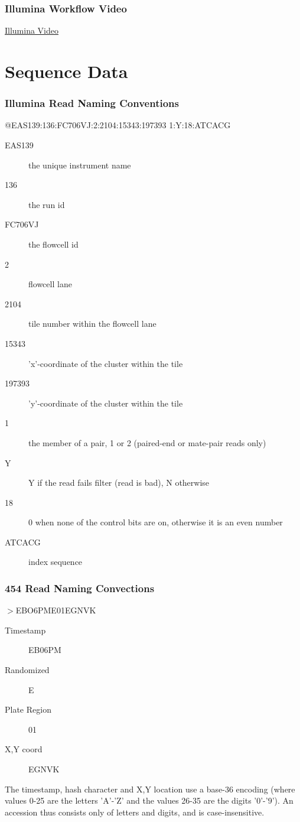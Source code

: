 \documentclass[pdf]{beamer}
\begin{document}
\begin{frame}
  \frametitle{Illumina Workflow Video}
  \begin{center}
  \href{http://www.youtube.com/watch?NR=1&feature=endscreen&v=l99aKKHcxC4}{Illumina Video}
  \end{center}
\end{frame} 

\section{Sequence Data}

\begin{frame}
  \frametitle{Illumina Read Naming Conventions}
  \begin{small}
  @EAS139:136:FC706VJ:2:2104:15343:197393 1:Y:18:ATCACG\\
  \end{small}  
  \begin{description}
  \item[EAS139]	the unique instrument name
  \item[136]	the run id
  \item[FC706VJ]	the flowcell id
  \item[2]	flowcell lane
  \item[2104]	tile number within the flowcell lane
  \item[15343]	'x'-coordinate of the cluster within the tile
  \item[197393]	'y'-coordinate of the cluster within the tile
  \item[1]	the member of a pair, 1 or 2 (paired-end or mate-pair reads only)
  \item[Y]	Y if the read fails filter (read is bad), N otherwise
  \item[18]	0 when none of the control bits are on, otherwise it is an even     number
  \item[ATCACG]	index sequence
  \end{description}
\end{frame}

\begin{frame}
  \frametitle{454 Read Naming Convections}
  $>$EBO6PME01EGNVK
  \begin{description}
  \item[Timestamp] EB06PM
  \item[Randomized ] E
  \item[Plate Region] 01
  \item[X,Y coord] EGNVK
  \end{description}
  The timestamp, hash character and X,Y location use a base-36 encoding (where values 0-25 are the letters 'A'-'Z' and the values 26-35 are the digits '0'-'9'). An accession thus consists only of letters and digits, and is case-insensitive. 
\end{frame}
   
\end{document}
